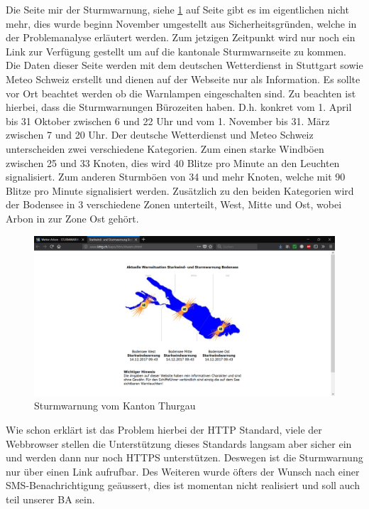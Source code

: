 \documentclass[a4paper,ngerman, 11pt, pagesize]{report}
\begin{document}
Die Seite mir der Sturmwarnung, siehe \ref{img:Sturmwarnung} auf Seite \pageref{img:Sturmwarnung} gibt es im eigentlichen nicht mehr, dies wurde beginn November umgestellt aus Sicherheitsgründen, welche in der Problemanalyse erläutert werden. Zum jetzigen Zeitpunkt wird nur noch ein Link zur Verfügung gestellt um auf die kantonale Sturmwarnseite zu kommen. Die Daten dieser Seite werden mit dem deutschen Wetterdienst in Stuttgart sowie Meteo Schweiz erstellt und dienen auf der Webseite nur als Information. Es sollte vor Ort beachtet werden ob die Warnlampen eingeschalten sind. Zu beachten ist hierbei, dass die Sturmwarnungen Bürozeiten haben. D.h. konkret vom 1. April bis 31 Oktober zwischen 6 und 22 Uhr und vom 1. November bis 31. März zwischen 7 und 20 Uhr. Der deutsche Wetterdienst und Meteo Schweiz unterscheiden zwei verschiedene Kategorien. Zum einen starke Windböen zwischen 25 und 33 Knoten, dies wird 40 Blitze pro Minute an den Leuchten signalisiert. Zum anderen Sturmböen von 34 und mehr Knoten, welche mit 90 Blitze pro Minute signalisiert werden. Zusätzlich zu den beiden Kategorien wird der Bodensee in 3 verschiedene Zonen unterteilt, West, Mitte und Ost, wobei Arbon in zur Zone Ost gehört. 
\begin{figure}[htbp]
	\centering
	\includegraphics[width=0.9\linewidth]{img/sturmwarnung}
	\caption{Sturmwarnung vom Kanton Thurgau}
	\label{img:Sturmwarnung}
\end{figure}

Wie schon erklärt ist das Problem hierbei der HTTP Standard, viele der Webbrowser stellen die Unterstützung dieses Standards langsam aber sicher ein und werden dann nur noch HTTPS unterstützen\cite{Mozilla:DeprecatingNon-SecureHTTP}. Deswegen ist die Sturmwarnung nur über einen Link aufrufbar. Des Weiteren wurde öfters der Wunsch nach einer SMS-Benachrichtigung geäussert, dies ist momentan nicht realisiert und soll auch teil unserer BA sein. 
\end{document}
